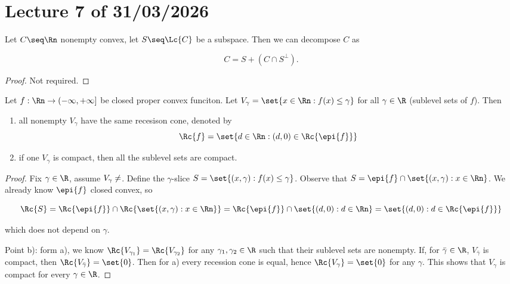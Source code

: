 \chapter{Lecture 7 of 31/03/2026}

\begin{proposition}
    
    Let $C \seq \Rn$ nonempty convex, let $S \seq \Lc{C}$ be a subspace. Then we can decompose $C$ as 

    \[ C = S + (C \cap S^\perp). \]

\end{proposition}

\begin{proof}
    Not required.
\end{proof}

\begin{proposition}
    
    Let $f : \Rn \to (-\infty,+\infty]$ be closed proper convex funciton. Let $V_\gamma = \set{x \in \Rn : f(x) \le \gamma}$ for all $\gamma \in \R$ (sublevel sets of $f$). Then

    \begin{enumerate}
        \item[a)] all nonempty $V_\gamma$ have the same recesison cone, denoted by 
            \[ \Rc{f} = \set{d \in \Rn : (d,0) \in \Rc{\epi{f}}} \]
        \item[b)] if one $V_\gamma$ is compact, then all the sublevel sets are compact.
    \end{enumerate}

\end{proposition}

\begin{proof}
    
    Fix $\gamma \in \R$, assume $V_\gamma \neq \empty$. Define the $\gamma$-slice $S = \set{(x,\gamma) : f(x) \le \gamma}$. Observe that $S = \epi{f} \cap \set{(x,\gamma) : x \in \Rn}$. We already know $\epi{f}$ closed convex, so 
    
    \[ \Rc{S} = \Rc{\epi{f}} \cap \Rc{\set{(x,\gamma) : x \in \Rn}} = \Rc{\epi{f}} \cap \set{(d,0) : d \in \Rn} = \set{(d,0) : d \in \Rc{\epi{f}}} \] 
    
    which does not depend on $\gamma$.

    Point b): form a), we know $\Rc{V_{\gamma_1}} = \Rc{V_{\gamma_2}}$ for any $\gamma_1,\gamma_2 \in \R$ such that their sublevel sets are nonempty. If, for $\bar{\gamma} \in \R$, $V_{\bar{\gamma}}$ is compact, then $\Rc{V_{\bar{\gamma}}} = \set{0}$. Then for a) every recession cone is equal, hence $\Rc{V_\gamma} = \set{0}$ for any $\gamma$. This shows that $V_\gamma$ is compact for every $\gamma \in \R$.

\end{proof}

